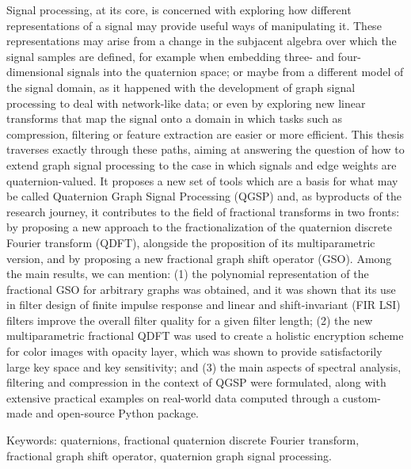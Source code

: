 
%

Signal processing, at its core, is concerned with exploring how different representations of a signal may provide useful ways of manipulating it. These representations may arise from a change in the subjacent algebra over which the signal samples are defined, for example when embedding three- and four-dimensional signals into the quaternion space; or maybe from a different model of the signal domain, as it happened with the development of graph signal processing to deal with network-like data; or even by exploring new linear transforms that map the signal onto a domain in which tasks such as compression, filtering or feature extraction are easier or more efficient.
This thesis traverses exactly through these paths, aiming at answering the question of how to extend graph signal processing to the case in which signals and edge weights are quaternion-valued. It proposes a new set of tools which are a basis for what may be called Quaternion Graph Signal Processing (QGSP) and, as byproducts of the research journey, it contributes to the field of fractional transforms in two fronts: by proposing a new approach to the fractionalization of the quaternion discrete Fourier transform (QDFT), alongside the proposition of its multiparametric version, and by proposing a new fractional graph shift operator (GSO).
Among the main results, we can mention: (1) the polynomial representation of the fractional GSO for arbitrary graphs was obtained, and it was shown that its use in filter design of finite impulse response and linear and shift-invariant (FIR LSI) filters improve the overall filter quality for a given filter length; (2) the new multiparametric fractional QDFT was used to create a holistic encryption scheme for color images with opacity layer, which was shown to provide satisfactorily large key space and key sensitivity; and (3) the main aspects of spectral analysis, filtering and compression in the context of QGSP were formulated, along with extensive practical examples on real-world data computed through a custom-made and open-source Python package.
\vspace{1em}

\noindent
Keywords: quaternions, fractional quaternion discrete Fourier transform, fractional graph shift operator, quaternion graph signal processing.
